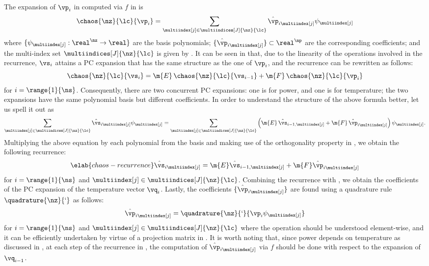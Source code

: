The expansion of $\vp_i$ in  computed via $f$ in
 is
\[
  \chaos{\nz}{\lc}{\vp_i} = \sum_{\multiindex[j] \in \multiindices[J]{\nz}{\lc}} \hat{\vp}_{i \multiindex[j]} \psi_{\multiindex[j]}
\]
where $\{ \psi_{\multiindex[j]}: \real^\nz \to \real \}$ are the basis
polynomials; $\{ \hat{\vp}_{i \multiindex[j]} \} \subset \real^\np$ are the
corresponding coefficients; and the multi-index set $\multiindices[J]{\nz}{\lc}$
is given by . It can be seen in
 that, due to the linearity of the operations
involved in the recurrence, $\vs_i$ attains a \ac{PC} expansion that has the
same structure as the one of $\vp_i$, and the recurrence can be rewritten as
follows:
\[
  \chaos{\nz}{\lc}{\vs_i} = \m{E} \, \chaos{\nz}{\lc}{\vs_{i - 1}} + \m{F} \, \chaos{\nz}{\lc}{\vp_i}
\]
for $i = \range{1}{\ns}$. Consequently, there are two concurrent \ac{PC}
expansions: one is for power, and one is for temperature; the two expansions
have the same polynomial basis but different coefficients. In order to
understand the structure of the above formula better, let us spell it out as
\[
  \sum_{\multiindex[j] \in \multiindices[J]{\nz}{\lc}} \hat{\vs}_{i \multiindex[j]} \psi_{\multiindex[j]} =
  \sum_{\multiindex[j] \in \multiindices[J]{\nz}{\lc}} \left(\m{E} \, \hat{\vs}_{i - 1, \multiindex[j]} + \m{F} \, \hat{\vp}_{i \multiindex[j]}\right) \psi_{\multiindex[j]}.
\]
Multiplying the above equation by each polynomial from the basis and making use
of the orthogonality property in , we obtain the
following recurrence:
\begin{equation} \elab{chaos-recurrence}
  \hat{\vs}_{i \multiindex[j]} = \m{E} \hat{\vs}_{i - 1, \multiindex[j]} + \m{F} \hat{\vp}_{i \multiindex[j]}
\end{equation}
for $i = \range{1}{\ns}$ and $\multiindex[j] \in \multiindices[J]{\nz}{\lc}$.
Combining the recurrence with , we obtain the
coefficients of the \ac{PC} expansion of the temperature vector $\vq_i$. Lastly,
the coefficients $\{ \hat{\vp}_{i \multiindex[j]} \}$ are found using a
quadrature rule $\quadrature{\nz}{\lq}$ as follows:
\[
  \hat{\vp}_{i \multiindex[j]} = \quadrature{\nz}{\lq}{\vp_i \psi_{\multiindex[j]}}
\]
for $i = \range{1}{\ns}$ and $\multiindex[j] \in \multiindices[J]{\nz}{\lc}$
where the operation should be understood element-wise, and it can be efficiently
undertaken by virtue of a projection matrix in .
It is worth noting that, since power depends on temperature as discussed in
, at each step of the recurrence in ,
the computation of $\hat{\vp}_{i \multiindex[j]}$ via $f$ should be done with
respect to the expansion of $\vq_{i - 1}$.

